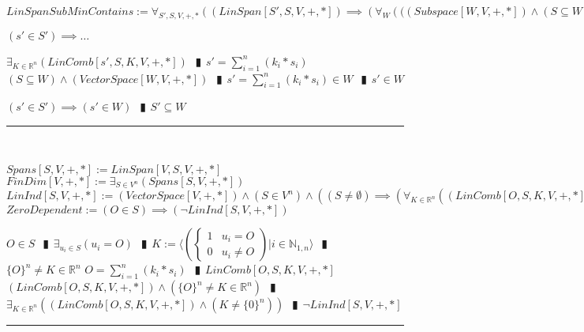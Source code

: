\documentclass{book}
\newcommand{\abr}{:=}
\newcommand{\pipe}{$\phantom{(}\vrectangleblack\phantom{)}$}
\newcommand{\pr}[1]{\left(#1\right)}
\begin{document}
\begin{shaded}
  $LinSpanSubMinContains \abr \forall_{S', S, V, +, *}\pr{(LinSpan[S', S, V, +, *]) \implies \pr{\forall_{W}\pr{((Subspace[W, V, + ,*]) \land (S \subseteq W)} \implies (S' \subseteq W)}}$
  \begin{enumerate}
    \lit $(s' \in S') \implies \ldots$
    \begin{enumerate}
      \lit $\exists_{K \in \mathbb{R}^n}(LinComb[s', S, K, V, +, *])$ \pipe $s' = \sum_{i = 1}^{n}(k_i * s_i)$
      \lit $(S \subseteq W) \land (VectorSpace[W, V, + ,*])$ \pipe $s' = \sum_{i = 1}^{n}(k_i * s_i) \in W$ \pipe $s' \in W$
    \end{enumerate}
    \lit $(s' \in S') \implies (s' \in W)$ \pipe $S' \subseteq W$
  \end{enumerate} \vspace{.75mm} \hrule \vspace{.75mm} \ \\ 
\end{shaded} %

$Spans[S, V, +, *] \abr LinSpan[V, S, V, +, *]$ \\
$FinDim[V, +, *] \abr \exists_{S \in V^n}(Spans[S, V, +, *])$ \\

$LinInd[S, V, +, *] \abr (VectorSpace[V, +, *]) \land (S \in V^n) \land \pr{(S \neq \emptyset) \implies \pr{\forall_{K \in \mathbb{R}^n}\pr{(LinComb[O, S, K, V, +, *]) \implies (K = \{0\}^n)}}}$ \\

$ZeroDependent \abr (O \in S) \implies (\lnot LinInd[S, V, +, *])$
\begin{enumerate}
  \lit $O \in S$ \pipe $\exists_{u_i \in S}(u_i = O)$ \pipe $K \abr \langle \left(\begin{cases} 
      1 & u_i = O \\
      0 & u_i \neq O 
    \end{cases}\right) | i \in \mathbb{N}_{1, n} \rangle$ \pipe $\{O\}^n \neq K \in \mathbb{R}^n$
  \lit $O = \sum_{i = 1}^{n}(k_i * s_i)$ \pipe $LinComb[O, S, K, V, +, *]$
  \lit $(LinComb[O, S, K, V, +, *]) \land (\{O\}^n \neq K \in \mathbb{R}^n)$ \pipe $\exists_{K \in \mathbb{R}^n}\pr{(LinComb[O, S, K, V, +, *]) \land (K \neq \{0\}^n)}$ \pipe $\lnot LinInd[S, V, +, *]$
\end{enumerate} \vspace{.75mm} \hrule \vspace{.75mm} \ \\ 
\end{document}
